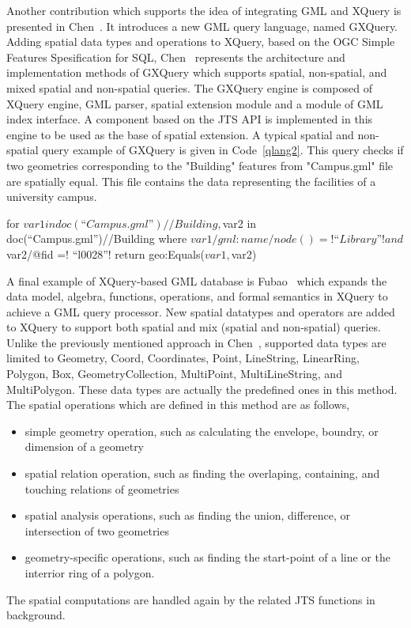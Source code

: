 \documentclass[a4paper,12pt]{article}
\begin{document}
Another contribution which supports the idea of integrating GML and XQuery is presented in Chen~\cite{Chen2010}.
It introduces a new GML query language, named GXQuery. 
Adding spatial data types and operations to XQuery, based on the OGC Simple Features Spesification for SQL, 
Chen~\cite{Chen2010} represents the architecture and implementation methods of GXQuery 
which supports spatial, non-spatial, and mixed spatial and non-spatial queries. 
The GXQuery engine is composed of XQuery engine, GML parser, spatial extension module 
and a module of GML index interface. 
A component based on the JTS API is implemented in this engine
to be used as the base of spatial extension. 
A typical spatial and non-spatial query example of GXQuery is given in Code~\ref{qlang2}.
This query checks if two geometries corresponding to the "Building" features from 
"Campus.gml" file are spatially equal. This file contains the data representing
the facilities of a university campus.
\vspace{10px}
\begin{fakeXML}[escapechar=\!,label=qlang2,caption=A typical example of combined spatial and non-spatial query in GXQuery.]
for $var1 in doc(“Campus.gml”)//Building,
    $var2 in doc(“Campus.gml”)//Building
where 
    $var1/gml:name/node()=! “Library”! and $var2/@fid =! “l0028”! 
return geo:Equals($var1, $var2)
\end{fakeXML}
\vspace{10px}

A final example of XQuery-based GML database is Fubao~\cite{Fubao2010}
which expands the data model, algebra, functions, operations, and formal semantics in XQuery 
to achieve a GML query processor. New spatial datatypes and operators are added to XQuery to support both spatial and mix (spatial and non-spatial) queries. Unlike the previously mentioned approach in Chen~\cite{Chen2010}, supported data types are limited to Geometry, Coord, Coordinates, Point, LineString, LinearRing, Polygon, Box, GeometryCollection, MultiPoint, MultiLineString, and MultiPolygon. 
These data types are actually the predefined ones in this method.
The spatial operations which are defined in this method are as follows,
\begin{itemize}
\item simple geometry operation, such as calculating the envelope, boundry, or dimension of a geometry
\item spatial relation operation, such as finding the overlaping, containing, and touching relations of geometries
\item spatial analysis operations, such as finding the union, difference, or intersection of two geometries
\item geometry-specific operations, such as finding the start-point of a line or the interrior ring of a polygon.
\end{itemize}
The spatial computations are handled again by the related JTS functions in background.
\end{document}
